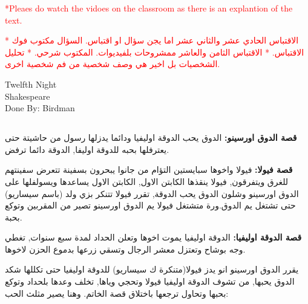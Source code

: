 \documentclass[12pt, a4paper]{article}
\begin{document}

\small{\textcolor{red}{*Pleaes do watch the vidoes on the classroom as 
there is an explantion of the text.\smallbreak}}

\begin{otherlanguage}{arabic}
  \textcolor{red}{
* الاقتباس الحادي عشر والثاني عشر اما يجن سؤال او اقتباس. السؤال مكتوب فوك الاقتباس.\smallbreak
* الاقتباس الثامن والعاشر ممشروحات بلفيديوات. المكتوب شرحي.\smallbreak
* تحليل الشخصيات بل اخير هي وصف شخصية من فم شخصية اخرى. 
  }
\end{otherlanguage}

\begin{center}
{\fonthead
\huge{Twelfth Night}\\[0.2cm]
\Large{Shakespeare}\\[0.5cm]
\large{Done By: Birdman}
}
\end{center}

\begin{otherlanguage}{arabic}

\section*{}
\textbf{قصة الدوق اورسينو:} الدوق يحب الدوقة اوليفيا ودائما يدزلها رسول من حاشيتة حتى يعترفلها بحبه 
للدوقة اوليفا, الدوقة دائما ترفض.

\textbf{قصة فيولا:} فيولا واخوها سبايستين التؤام من جانوا يبحرون بسفينة تتعرض سفينتهم للغرق ويتفرقون, فيولا 
ينقذها الكابتن الاول, الكابتن الاول يساعدها ويسولفلها على الدوق اورسينو وشلون الدوق يحب الدوقة, تقرر فيولا
تتنكر بزي ولد (باسم سيساريو) حتى تشتغل يم الدوق.ورة متشتغل فيولا يم الدوق اورسينو تصير من المقربين وتوكع بحبة.

\textbf{قصة الدوقة اوليفيا:} الدوقة اوليفيا يموت اخوها وتعلن الحداد لمدة سبع سنوات, تغطي وجه بوشاح 
وتعتزل معشر الرجال وتسقي زرعها بدموع الحزن لاخوها. 

يقرر  الدوق اورسينو انو يدز فيولا(متنكرة ك سيساريو) للدوقة اوليفيا حتى تكللها شكد الدوق يحبها, من 
تشوف الدوقة اوليفيا فيولا وتحجي وياها, تخلف وعدها بلحداد وتوكع بحبها وتحاول ترجعها باختلاق قصة الخاتم.
وهنا يصير مثلث الحب: 

  
\end{otherlanguage}

\section*{}
\end{document}
